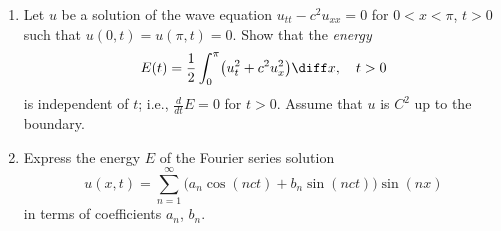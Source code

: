 \begin{problem}
  \begin{enumerate}[label=(\alph*),noitemsep]
  \item Let \(u\) be a solution of the wave equation \(u_{tt}-c^2u_{xx}=0\)
    for \(0<x<\pi\), \(t>0\) such that \(u(0,t)=u(\pi,t)=0\). Show that the
    \emph{energy}
    \[
      E(t)=\frac{1}{2}\int_0^\pi \bigl(u_t^2+c^2u_x^2 \bigr)\diff x,\quad t>0
    \]
    is independent of \(t\); i.e., \(\frac{d}{dt}E=0\) for \(t>0\). Assume that
    \(u\) is \(C^2\) up to the boundary.
  \item Express the energy \(E\) of the Fourier series solution
    \[
      u(x,t)=\sum_{n=1}^\infty
      \bigl(a_n\cos(nct)+b_n\sin(nct)\bigr)\sin(nx)
    \]
    in terms of coefficients \(a_n\), \(b_n\).
  \end{enumerate}
\end{problem}
